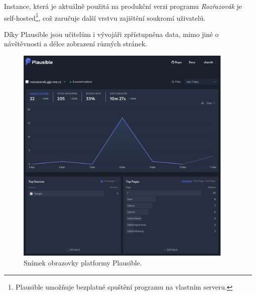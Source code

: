 Instance, která je aktuálně použitá na produkční verzi programu \emph{Rozřazovák} je self-hosted\footnote{Plausible umožňuje bezplatné spuštění programu na vlastním serveru.}, což zaručuje další vrstvu zajištění soukromí uživatelů.

Díky Plausible jsou učitelům i vývojáři zpřístupněna data, mimo jiné o návštěvnosti  a délce zobrazení různých stránek.

\begin{figure}[H]
    \centering
    \includegraphics[width=400px]{images/02technologie/plausible.png}
    \caption{Snímek obrazovky platformy Plausible.}
\end{figure}